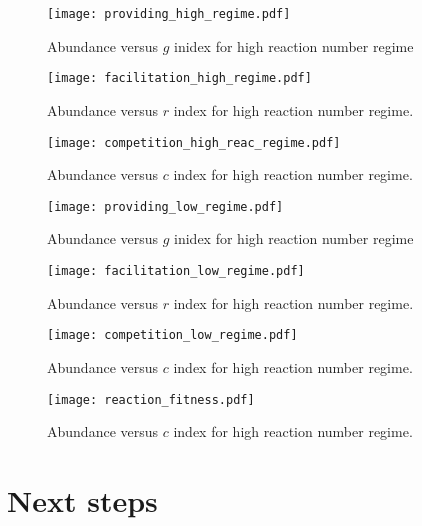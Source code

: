 \documentclass[10pt,letterpaper]{article}
\begin{document}
\begin{itemize}
			\begin{figure}[h]
				\centering
				\texttt{[image: providing\_high\_regime.pdf]}
				\caption{Abundance versus $ g $ inidex for high reaction number regime}
			\end{figure}
			\begin{figure}[h]
				\centering
				\texttt{[image: facilitation\_high\_regime.pdf]}
				\caption{Abundance versus $ r $ index for high reaction number regime.}
			\end{figure}
				\begin{figure}[h]
				\centering
				\texttt{[image: competition\_high\_reac\_regime.pdf]}
				\caption{Abundance versus $ c $ index for high reaction number regime.}
			\end{figure}
		
		
		
			\begin{figure}[h]
			\centering
			\texttt{[image: providing\_low\_regime.pdf]}
			\caption{Abundance versus $ g $ inidex for high reaction number regime}
			\end{figure}
			\begin{figure}[h]
				\centering
				\texttt{[image: facilitation\_low\_regime.pdf]}
				\caption{Abundance versus $ r $ index for high reaction number regime.}
			\end{figure}
			\begin{figure}[h]
				\centering
				\texttt{[image: competition\_low\_regime.pdf]}
				\caption{Abundance versus $ c $ index for high reaction number regime.}
			\end{figure}
			\begin{figure}[h]
				\centering
				\texttt{[image: reaction\_fitness.pdf]}
				\caption{Abundance versus $ c $ index for high reaction number regime.}
			\end{figure}	
    		\end{itemize}
    	\section*{Next steps}
    	
\end{document}
